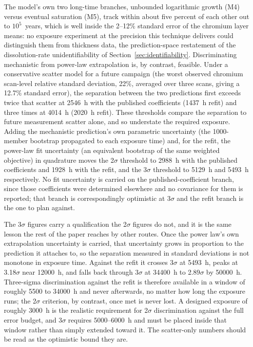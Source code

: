 \documentclass[a4paper,fleqn]{cas-sc}
\begin{document}
The model's own two long-time branches, unbounded logarithmic growth
(M4) versus eventual saturation (M5), track within about five percent
of each other out to $10^5$~years, which is well inside the 2--12\% standard error of the chromium layer means: no exposure
experiment at the precision this technique delivers could distinguish
them from thickness data, the prediction-space
restatement of the dissolution-rate unidentifiability of
Section~\ref{sec:identifiability}. Discriminating mechanistic from
power-law extrapolation is, by contrast, feasible. Under a conservative
scatter model for a future campaign (the worst observed chromium
scan-level relative standard deviation, 22\%, averaged over three
scans, giving a 12.7\% standard error), the separation between the two
predictions first exceeds twice that scatter at 2546~h with the
published coefficients (1437~h refit) and three times at 4014~h
(2020~h refit). These thresholds compare the separation to future
measurement scatter alone, and so understate the required exposure. Adding
the mechanistic prediction's own parametric uncertainty (the
1000-member bootstrap propagated to each exposure time) and, for the
refit, the power-law fit uncertainty (an equivalent bootstrap of the same
weighted objective) in quadrature moves the 2$\sigma$ threshold to 2988~h
with the published coefficients and 1928~h with the refit, and the
3$\sigma$ threshold to 5129~h and 5493~h respectively. No fit uncertainty
is carried on the published-coefficient branch, since those coefficients
were determined elsewhere and no covariance for them is reported; that
branch is correspondingly optimistic at 3$\sigma$ and the refit branch is
the one to plan against.

The 3$\sigma$ figures carry a qualification the 2$\sigma$ figures do not,
and it is the same lesson the rest of the paper reaches by other routes.
Once the power law's own extrapolation uncertainty is carried, that
uncertainty grows in proportion to the prediction it attaches to, so the
separation measured in standard deviations is not monotone in exposure
time. Against the refit it crosses 3$\sigma$ at 5493~h, peaks at
3.18$\sigma$ near 12000~h, and falls back through 3$\sigma$ at
34400~h to 2.89$\sigma$ by 50000~h. Three-sigma discrimination against
the refit is therefore available in a window of roughly 5500 to
34000~h and never afterwards, no matter how long the exposure runs; the
2$\sigma$ criterion, by contrast, once met is never lost. A designed
exposure of roughly 3000~h is the realistic requirement for 2$\sigma$
discrimination against the full error budget, and 3$\sigma$ requires
5000--6000~h and must be placed inside that window rather than simply
extended toward it. The scatter-only numbers should be read as the
optimistic bound they are.
\end{document}
